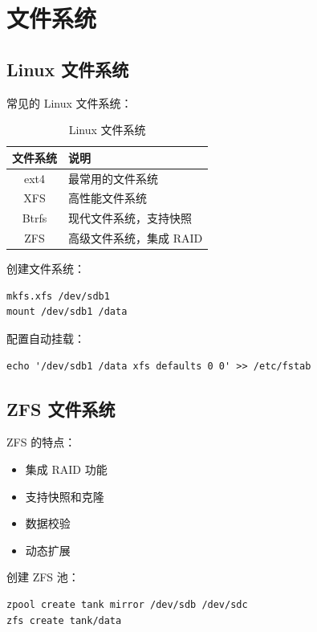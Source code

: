 \documentclass[12pt,UTF8]{ctexbook}
\begin{document}
\chapter{文件系统}
\label{chap:file_systems}

\section{Linux 文件系统}
\label{sec:linux_file_systems}

常见的 Linux 文件系统：
\begin{table}[htbp]
    \centering
    \caption{Linux 文件系统}
    \begin{tabular}{|c|p{8cm}|}
        \hline
        \textbf{文件系统} & \textbf{说明} \\
        \hline
        ext4 & 最常用的文件系统 \\
        \hline
        XFS & 高性能文件系统 \\
        \hline
        Btrfs & 现代文件系统，支持快照 \\
        \hline
        ZFS & 高级文件系统，集成 RAID \\
        \hline
    \end{tabular}
\end{table}

创建文件系统：
\begin{verbatim}
mkfs.xfs /dev/sdb1
mount /dev/sdb1 /data
\end{verbatim}

配置自动挂载：
\begin{verbatim}
echo '/dev/sdb1 /data xfs defaults 0 0' >> /etc/fstab
\end{verbatim}

\section{ZFS 文件系统}
\label{sec:zfs}

ZFS 的特点：
\begin{itemize}
    \item 集成 RAID 功能
    \item 支持快照和克隆
    \item 数据校验
    \item 动态扩展
\end{itemize}

创建 ZFS 池：
\begin{verbatim}
zpool create tank mirror /dev/sdb /dev/sdc
zfs create tank/data
\end{verbatim}
\end{document}
